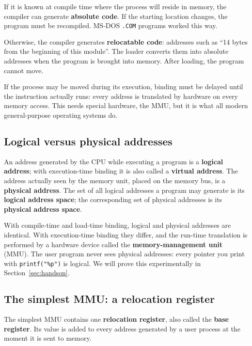 \documentclass[11pt,a4paper]{article}
\newcommand{\term}[1]{\textbf{\color{mintdeep}#1}}
\newcommand{\cmd}[1]{\texttt{#1}}
\begin{document}
\begin{description}[leftmargin=0pt,style=nextline,itemsep=0.3em]
  \item[Compile time] If it is known at compile time where the process will reside in memory, the compiler can generate \term{absolute code}. If the starting location changes, the program must be recompiled. MS-DOS \texttt{.COM} programs worked this way.
  \item[Load time] Otherwise, the compiler generates \term{relocatable code}: addresses such as ``14 bytes from the beginning of this module''. The loader converts them into absolute addresses when the program is brought into memory. After loading, the program cannot move.
  \item[Execution time] If the process may be moved during its execution, binding must be delayed until the instruction actually runs: every address is translated by hardware on every memory access. This needs special hardware, the MMU, but it is what all modern general-purpose operating systems do.
\end{description}

\subsection{Logical versus physical addresses}

An address generated by the CPU while executing a program is a \term{logical address}; with execution-time binding it is also called a \term{virtual address}. The address actually seen by the memory unit, placed on the memory bus, is a \term{physical address}. The set of all logical addresses a program may generate is its \term{logical address space}; the corresponding set of physical addresses is its \term{physical address space}.

With compile-time and load-time binding, logical and physical addresses are identical. With execution-time binding they differ, and the run-time translation is performed by a hardware device called the \term{memory-management unit} (MMU). The user program never sees physical addresses: every pointer you print with \cmd{printf("\%p")} is logical. We will prove this experimentally in Section~\ref{sec:handson}.

\subsection{The simplest MMU: a relocation register}

The simplest MMU contains one \term{relocation register}, also called the \term{base register}. Its value is added to every address generated by a user process at the moment it is sent to memory.
\end{document}
